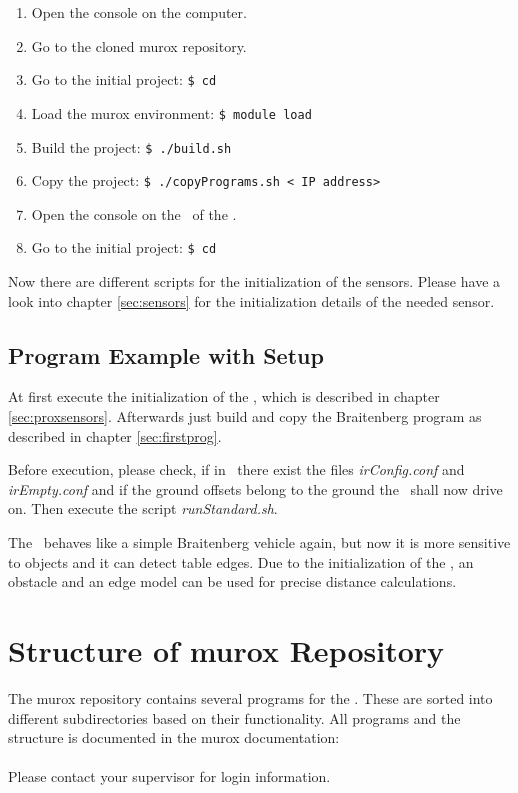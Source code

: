 \begin{enumerate}
\item Open the console on the computer.
\item Go to the cloned murox repository.
\item Go to the initial project: {\tt\$ cd \demopath\initialname}
\item Load the murox environment: {\tt\$ module load \modulemurox}
\item Build the project: {\tt\$ ./build.sh}
\item Copy the project: {\tt\$ ./copyPrograms.sh <\amiro\ IP address>}
\item Open the console on the \cognition\ of the \amiro.
\item Go to the initial project: {\tt\$ cd \amirohomepath\initialname}
\end{enumerate}

Now there are different scripts for the initialization of the sensors. Please have a look into chapter \ref{sec:sensors} for the initialization details of the needed sensor.

\section{Program Example with Setup}
\label{sec:firstprogsetup}

At first execute the initialization of the \proxring, which is described in chapter \ref{sec:proxsensors}. Afterwards just build and copy the Braitenberg program as described in chapter \ref{sec:firstprog}.

Before execution, please check, if in \amirohomepathI\initialnameI\ there exist the files {\it irConfig.conf} and {\it irEmpty.conf} and if the ground offsets belong to the ground the \amiro\ shall now drive on. Then execute the script {\it runStandard.sh}.

The \amiro\ behaves like a simple Braitenberg vehicle again, but now it is more sensitive to objects and it can detect table edges. Due to the initialization of the \proxring, an obstacle and an edge model can be used for precise distance calculations.


\chapter{Structure of murox Repository}
\label{sec:structuremurox}

The murox repository contains several programs for the \cognition. These are sorted into different subdirectories based on their functionality. All programs and the structure is documented in the murox documentation: \\
\muroxdocu \\
Please contact your supervisor for login information.

